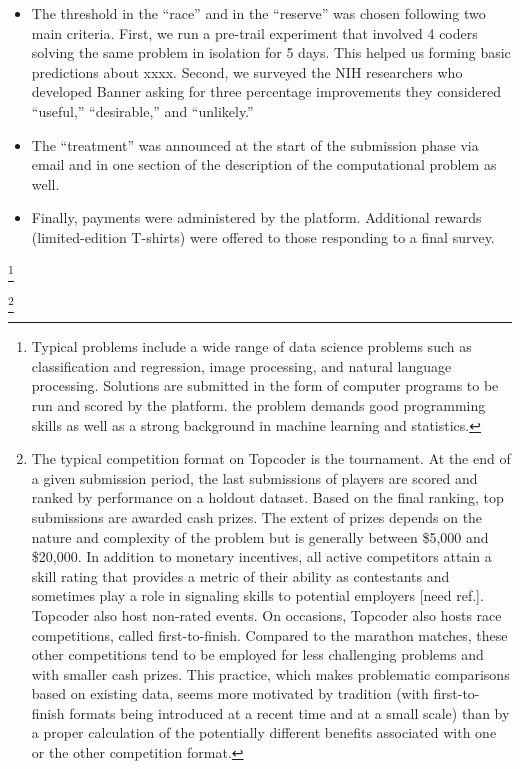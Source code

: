 \documentclass[11pt, titlepage]{article}
\begin{document}
\begin{itemize}
\item
  The threshold in the ``race'' and in the ``reserve'' was chosen
  following two main criteria. First, we run a pre-trail experiment that
  involved 4 coders solving the same problem in isolation for 5 days.
  This helped us forming basic predictions about xxxx. Second, we
  surveyed the NIH researchers who developed Banner asking for three
  percentage improvements they considered ``useful,'' ``desirable,'' and
  ``unlikely.''
\item
  The ``treatment'' was announced at the start of the submission phase
  via email and in one section of the description of the computational
  problem as well.
\item
  Finally, payments were administered by the platform. Additional
  rewards (limited-edition T-shirts) were offered to those responding to
  a final survey.
\end{itemize}

\footnote{Typical problems include a wide range of data science problems
  such as classification and regression, image processing, and natural
  language processing. Solutions are submitted in the form of computer
  programs to be run and scored by the platform. the problem demands
  good programming skills as well as a strong background in machine
  learning and statistics.}

\footnote{The typical competition format on Topcoder is the tournament.
  At the end of a given submission period, the last submissions of
  players are scored and ranked by performance on a holdout dataset.
  Based on the final ranking, top submissions are awarded cash prizes.
  The extent of prizes depends on the nature and complexity of the
  problem but is generally between \$5,000 and \$20,000. In addition to
  monetary incentives, all active competitors attain a skill rating that
  provides a metric of their ability as contestants and sometimes play a
  role in signaling skills to potential employers {[}need ref.{]}.
  Topcoder also host non-rated events. On occasions, Topcoder also hosts
  race competitions, called first-to-finish. Compared to the marathon
  matches, these other competitions tend to be employed for less
  challenging problems and with smaller cash prizes. This practice,
  which makes problematic comparisons based on existing data, seems more
  motivated by tradition (with first-to-finish formats being introduced
  at a recent time and at a small scale) than by a proper calculation of
  the potentially different benefits associated with one or the other
  competition format.}
\end{document}
